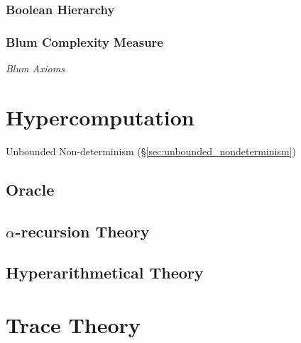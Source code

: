 \subsubsection{Boolean Hierarchy}




\subsubsection{Blum Complexity Measure}

\emph{Blum Axioms}



\section{Hypercomputation}\label{sec:hypercomputation}

Unbounded Non-determinism (\S\ref{sec:unbounded_nondeterminism})



\subsection{Oracle}\label{sec:oracle}

\subsection{$\alpha$-recursion Theory}\label{sec:alpha_recursion}

\subsection{Hyperarithmetical Theory}\label{sec:hyperarithmetical_theory}



\section{Trace Theory}\label{sec:trace_theory}

